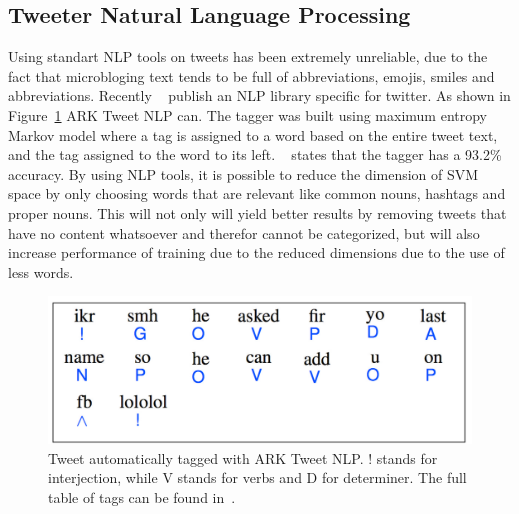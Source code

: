 \subsection{Tweeter Natural Language Processing}
\label{sub:tweeter_natural_language_processing}
Using standart \ac{NLP} tools on tweets has been extremely unreliable, due to the fact that microbloging text tends to be full of abbreviations, emojis, smiles and abbreviations. Recently ~\citet{owoputi13improvedparth} publish an \ac{NLP} library specific for twitter. As shown in Figure~\ref{fig:nlp} ARK Tweet \ac{NLP} can. The tagger was built using maximum entropy Markov model where a tag is assigned to a word based on the entire tweet text, and the tag assigned to the word to its left. ~\citet{owoputi13improvedparth} states that the tagger has a 93.2\% accuracy. 
By using \ac{NLP} tools, it is possible to reduce the dimension of \ac{SVM} space by only choosing words that are relevant like common nouns, hashtags and proper nouns. This will not only will yield better results by removing tweets that have no content whatsoever and therefor cannot be categorized, but will also increase performance of training due to the reduced dimensions due to the use of less words.
\begin{figure}[htpb]
  \centering
  \includegraphics[width=0.6\linewidth]{./images/nlp.pdf}
  \caption{Tweet automatically tagged with ARK Tweet NLP. ! stands for interjection, while V stands for verbs and D for determiner. The full table of tags can be found in~\cite{owoputi13improvedparth}.}
  \label{fig:nlp}
\end{figure}

